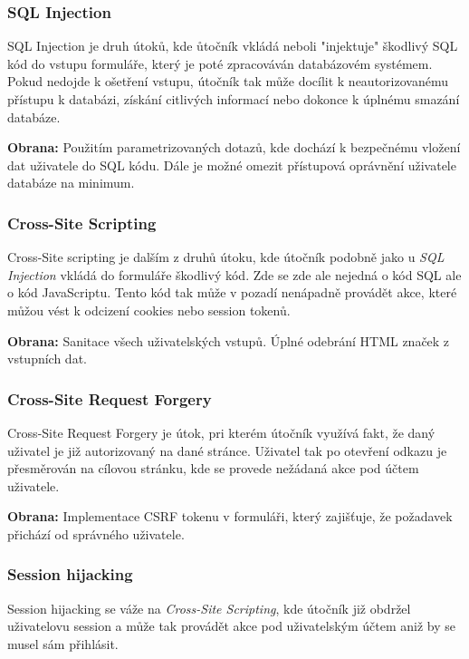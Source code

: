 \subsubsection*{SQL Injection}
\label{subsubsec:security-attacks-sql-injection}
SQL Injection je druh útoků, kde ůtočník vkládá neboli "injektuje" škodlivý SQL kód do vstupu formuláře, který je poté zpracováván databázovém systémem. Pokud nedojde k ošetření vstupu, útočník tak může docílit k neautorizovanému přístupu k databázi, získání citlivých informací nebo dokonce k úplnému smazání databáze.

\textbf{Obrana:} Použitím parametrizovaných dotazů, kde dochází k bezpečnému vložení dat uživatele do SQL kódu. Dále je možné omezit přístupová oprávnění uživatele databáze na minimum.

\subsubsection*{Cross-Site Scripting}
\label{subsubsec:security-attacks-cross-site-scripting}
Cross-Site scripting je dalším z druhů útoku, kde útočník podobně jako u \textit{SQL Injection} vkládá do formuláře škodlivý kód. Zde se zde ale nejedná o kód SQL ale o kód JavaScriptu. Tento kód tak může v pozadí nenápadně provádět akce, které můžou vést k odcizení cookies nebo session tokenů.

\textbf{Obrana:} Sanitace všech uživatelských vstupů. Úplné odebrání HTML značek z vstupních dat.

\subsubsection*{Cross-Site Request Forgery}
\label{subsubsec:security-attacks-cross-site-request-forgery}
Cross-Site Request Forgery je útok, pri kterém útočník využívá fakt, že daný uživatel je již autorizovaný na dané stránce. Uživatel tak po otevření odkazu je přesměrován na cílovou stránku, kde se provede nežádaná akce pod účtem uživatele.

\textbf{Obrana:} Implementace CSRF tokenu v formuláři, který zajišťuje, že požadavek přichází od správného uživatele.

\subsubsection*{Session hijacking}
\label{subsubsec:security-attacks-session-hijacking}
Session hijacking se váže na \textit{Cross-Site Scripting}, kde útočník již obdržel uživatelovu session a může tak provádět akce pod uživatelským účtem aniž by se musel sám přihlásit.

